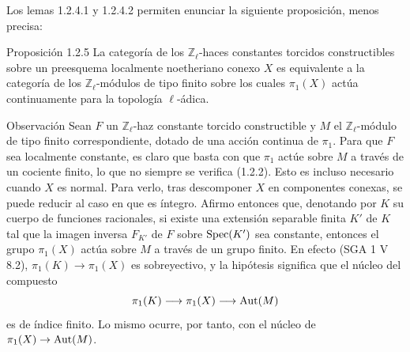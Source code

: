 Los lemas 1.2.4.1 y 1.2.4.2 permiten enunciar la siguiente proposición, menos precisa:

\begin{statement}{Proposición 1.2.5}
La categoría de los \(\mathbb Z_\ell\)-haces constantes torcidos constructibles sobre un preesquema localmente noetheriano conexo \(X\) es equivalente a la categoría de los \(\mathbb Z_\ell\)-módulos de tipo finito sobre los cuales \(\pi_1(X)\) actúa continuamente para la topología \(\ell\)-ádica.
\end{statement}

\begin{statement}{Observación}
Sean \(F\) un \(\mathbb Z_\ell\)-haz constante torcido constructible y \(M\) el \(\mathbb Z_\ell\)-módulo de tipo finito correspondiente, dotado de una acción continua de \(\pi_1\). Para que \(F\) sea localmente constante, es claro que basta con que \(\pi_1\) actúe sobre \(M\) a través de un cociente finito, lo que no siempre se verifica (1.2.2). Esto es incluso necesario cuando \(X\) es normal. Para verlo, tras descomponer \(X\) en componentes conexas, se puede reducir al caso en que es íntegro. Afirmo entonces que, denotando por \(K\) su cuerpo de funciones racionales, si existe una extensión separable finita \(K'\) de \(K\) tal que la imagen inversa \(F_{K'}\) de \(F\) sobre \(\operatorname{Spec}(K')\) sea constante, entonces el grupo \(\pi_1(X)\) actúa sobre \(M\) a través de un grupo finito. En efecto (SGA 1 V 8.2), \(\pi_1(K)\to \pi_1(X)\) es sobreyectivo, y la hipótesis significa que el núcleo del compuesto
\[
\pi_1(K)\longrightarrow \pi_1(X)\longrightarrow \operatorname{Aut}(M)
\]
es de índice finito. Lo mismo ocurre, por tanto, con el núcleo de \(\pi_1(X)\to\operatorname{Aut}(M)\).
\end{statement}
